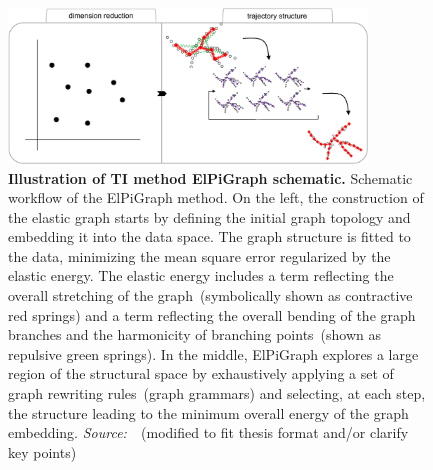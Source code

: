 \begin{description}
\begin{figure}[h!]
  	\centering
  	\includegraphics[width=0.85\textwidth]{TI_Alg_ElPiGraph/fig}
  	\vspace{0.1cm}
  	\caption[Illustration of TI method ElPiGraph schematic.]{\textbf{Illustration of TI method ElPiGraph schematic.} Schematic workflow of the ElPiGraph method. On the left, the construction of the elastic graph starts by defining the initial graph topology and embedding it into the data space. The graph structure is fitted to the data, minimizing the mean square error regularized by the elastic energy. The elastic energy includes a term reflecting the overall stretching of the graph~(symbolically shown as contractive red springs) and a term reflecting the overall bending of the graph branches and the harmonicity of branching points~(shown as repulsive green springs). In the middle, ElPiGraph explores a large region of the structural space by exhaustively applying a set of graph rewriting rules~(graph grammars) and selecting, at each step, the structure leading to the minimum overall energy of the graph embedding. \emph{Source:~\cite{cao2019monocle3}}~(modified to fit thesis format and/or clarify key points)
  	}
  	\label{fig:TI_Alg_ElPiGraph}
\end{figure}


\end{description}
